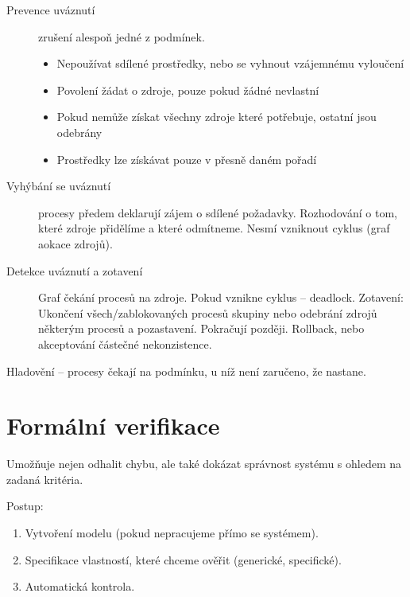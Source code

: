 \documentclass[a4paper, 11pt]{report}
\begin{document}
\begin{description}
	\item[Prevence uváznutí] zrušení alespoň jedné z podmínek.
	\begin{itemize}
		\item Nepoužívat sdílené prostředky, nebo se vyhnout vzájemnému vyloučení
		\item Povolení žádat o zdroje, pouze pokud žádné nevlastní
		\item Pokud nemůže získat všechny zdroje které potřebuje, ostatní jsou odebrány
		\item Prostředky lze získávat pouze v přesně daném pořadí
	\end{itemize}

	\item[Vyhýbání se uváznutí] procesy předem deklarují zájem o sdílené požadavky. Rozhodování o tom, které zdroje přidělíme a které odmítneme. Nesmí vzniknout cyklus (graf aokace zdrojů).
	\item[Detekce uváznutí a zotavení] Graf čekání procesů na zdroje. Pokud vznikne cyklus -- deadlock. Zotavení: Ukončení všech/zablokovaných procesů skupiny nebo odebrání zdrojů některým procesů a pozastavení. Pokračují později. Rollback, nebo akceptování částečné nekonzistence.
\end{description}

Hladovění -- procesy čekají na podmínku, u níž není zaručeno, že nastane.

\section{Formální verifikace}
Umožňuje nejen odhalit chybu, ale také dokázat správnost systému s ohledem na zadaná kritéria.

Postup:
\begin{enumerate}
	\item Vytvoření modelu (pokud nepracujeme přímo se systémem).
	\item Specifikace vlastností, které chceme ověřit (generické, specifické).
	\item Automatická kontrola.
\end{enumerate}
\end{document}

